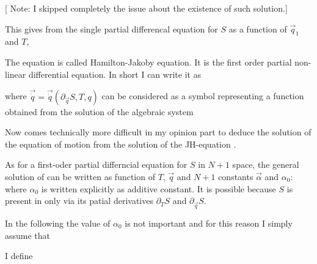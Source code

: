 \documentclass{article}
\begin{document}
[ Note: I skipped completely the issue about the existence of such solution.]

This gives from  the single partial differencal equation 
for $S$ as a function of $\vec{q}_1$ and $T$,

The equation  is called Hamilton-Jakoby equation. 
It is the first order partial non-linear differential equation. 
In short I can write it as 

where $\vec{\dot{q}} = \vec{\dot{q}}(\partial_{\vec{q}}S, T, q)$ 
can be considered as a symbol representing a function
 obtained from the solution of the algebraic system

\par 

Now comes technically more difficult in my opinion part to 
deduce the solution of the equation of motion  from 
the solution of the JH-equation .

\par

As for a first-oder partial differncial equation for $S$ in $N+1$ space, 
the general solution of  can be written as function
of $T$, $\vec{q}$ and $N + 1$ constants $\vec{\alpha}$ and $\alpha_0$:
where $\alpha_0$ is written explicitly as additive constant. 
It is possible because $S$ is present in  only via
its patial derivatives $\partial_T S$ and $\partial_{\vec{q}} S$.

\par
In the following the value of $\alpha_0$ is not important and for 
this reason I simply assume that

I define 
\end{document}

